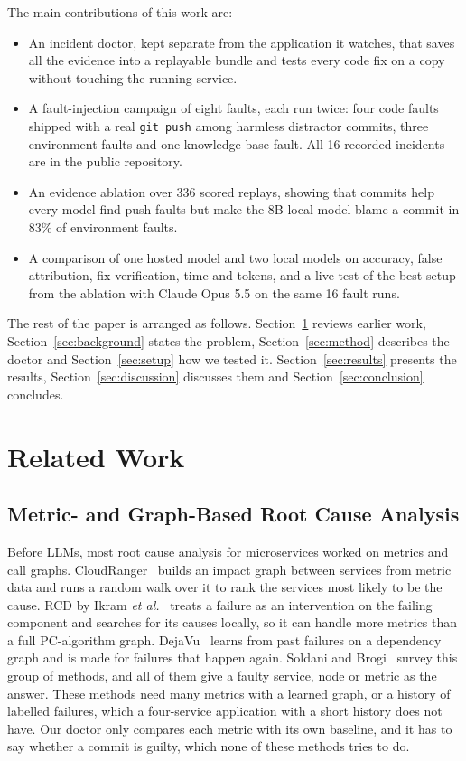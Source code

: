 \documentclass[12pt,onecolumn,draftclsnofoot]{IEEEtran}
\begin{document}
The main contributions of this work are:
\begin{itemize}
\item An incident doctor, kept separate from the application it watches, that saves all the evidence into a replayable bundle and tests every code fix on a copy without touching the running service.
\item A fault-injection campaign of eight faults, each run twice: four code faults shipped with a real \texttt{git push} among harmless distractor commits, three environment faults and one knowledge-base fault. All 16 recorded incidents are in the public repository.
\item An evidence ablation over 336 scored replays, showing that commits help every model find push faults but make the 8B local model blame a commit in 83\% of environment faults.
\item A comparison of one hosted model and two local models on accuracy, false attribution, fix verification, time and tokens, and a live test of the best setup from the ablation with Claude Opus 5.5 on the same 16 fault runs.
\end{itemize}

The rest of the paper is arranged as follows. Section~\ref{sec:related} reviews earlier work, Section~\ref{sec:background} states the problem, Section~\ref{sec:method} describes the doctor and Section~\ref{sec:setup} how we tested it. Section~\ref{sec:results} presents the results, Section~\ref{sec:discussion} discusses them and Section~\ref{sec:conclusion} concludes.

\section{Related Work}\label{sec:related}

\subsection{Metric- and Graph-Based Root Cause Analysis}
Before LLMs, most root cause analysis for microservices worked on metrics and call graphs. CloudRanger~\cite{wang2018cloudranger} builds an impact graph between services from metric data and runs a random walk over it to rank the services most likely to be the cause. RCD by Ikram \emph{et al.}~\cite{ikram2022rcd} treats a failure as an intervention on the failing component and searches for its causes locally, so it can handle more metrics than a full PC-algorithm graph. DejaVu~\cite{li2022dejavu} learns from past failures on a dependency graph and is made for failures that happen again. Soldani and Brogi~\cite{soldani2022survey} survey this group of methods, and all of them give a faulty service, node or metric as the answer. These methods need many metrics with a learned graph, or a history of labelled failures, which a four-service application with a short history does not have. Our doctor only compares each metric with its own baseline, and it has to say whether a commit is guilty, which none of these methods tries to do.
\end{document}
